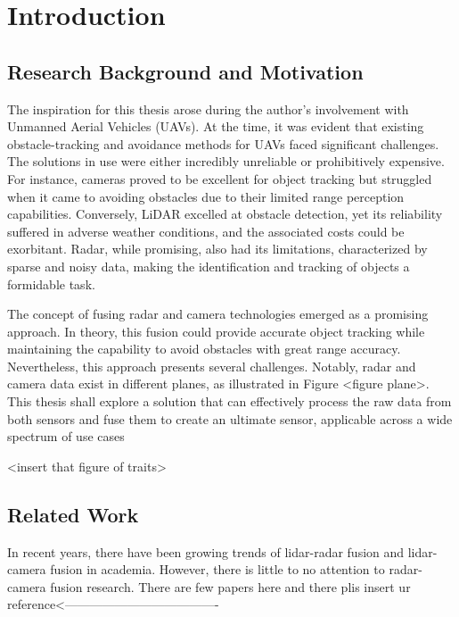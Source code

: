 \chapter{Introduction}\label{chap:intro}


\section{Research Background and Motivation}\label{sec:1-motivation}
The inspiration for this thesis arose during the author's involvement with Unmanned Aerial Vehicles (UAVs). 
At the time, it was evident that existing obstacle-tracking and avoidance methods for UAVs faced significant challenges. 
The solutions in use were either incredibly unreliable or prohibitively expensive.
For instance, cameras proved to be excellent for object tracking but struggled when it came to avoiding obstacles due to their limited range perception capabilities.
Conversely, LiDAR excelled at obstacle detection, yet its reliability suffered in adverse weather conditions, and the associated costs could be exorbitant. 
Radar, while promising, also had its limitations, characterized by sparse and noisy data, making the identification and tracking of objects a formidable task.

The concept of fusing radar and camera technologies emerged as a promising approach.
In theory, this fusion could provide accurate object tracking while maintaining the capability to avoid obstacles with great range accuracy. 
Nevertheless, this approach presents several challenges. 
Notably, radar and camera data exist in different planes, as illustrated in Figure <figure plane>.
This thesis shall explore a solution that can effectively process the raw data from both sensors 
and fuse them to create an ultimate sensor, applicable across a wide spectrum of use cases


<insert that figure of traits>


\section{Related Work}\label{sec:1-related_work}
In recent years, there have been growing trends of lidar-radar fusion and lidar-camera fusion in academia.
However, there is little to no attention to radar-camera fusion research. 
There are few papers here and there plis insert ur reference<-------------------------------------


